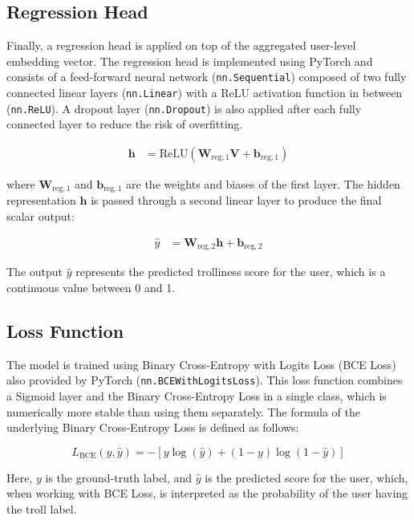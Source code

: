 \documentclass[twoside]{ctuthesis}
\theoremstyle{plain}
\theoremstyle{definition}
\theoremstyle{note}
\begin{document}
\subsection{Regression Head}

Finally, a regression head is applied on top of the aggregated user-level embedding vector. The regression head is implemented using PyTorch and consists of a feed-forward neural network (\texttt{nn.Sequential}) composed of two fully connected linear layers (\texttt{nn.Linear}) with a ReLU activation function in between (\texttt{nn.ReLU}). A dropout layer (\texttt{nn.Dropout}) is also applied after each fully connected layer to reduce the risk of overfitting.

\begin{align}
    \mathbf{h} &= \mathrm{ReLU}(\mathbf{W}_{\mathrm{reg,1}} \mathbf{V} + \mathbf{b}_{\mathrm{reg,1}})
\end{align}

where \( \mathbf{W}_{\mathrm{reg,1}} \) and \( \mathbf{b}_{\mathrm{reg,1}} \) are the weights and biases of the first layer. The hidden representation \( \mathbf{h} \) is passed through a second linear layer to produce the final scalar output:

\begin{align}
    \hat{y} &= \mathbf{W}_{\mathrm{reg,2}} \mathbf{h} + \mathbf{b}_{\mathrm{reg,2}}
\end{align}

The output \( \hat{y} \) represents the predicted trolliness score for the user, which is a continuous value between 0 and 1.
\subsection{Loss Function}

The model is trained using Binary Cross-Entropy with Logits Loss (BCE Loss) also provided by PyTorch (\texttt{nn.BCEWithLogitsLoss}). This loss function combines a Sigmoid layer and the Binary Cross-Entropy Loss in a single class, which is numerically more stable than using them separately. The formula of the underlying Binary Cross-Entropy Loss is defined as follows:

\begin{equation}
 L_{\mathrm{BCE}}(y, \hat{y}) = - \left[ y \log(\hat{y}) + (1 - y) \log(1 - \hat{y}) \right]
\end{equation}

Here, \( y \) is the ground-truth label, and \( \hat{y} \) is the predicted score for the user, which, when working with BCE Loss, is interpreted as the probability of the user having the troll label.\par
\end{document}
